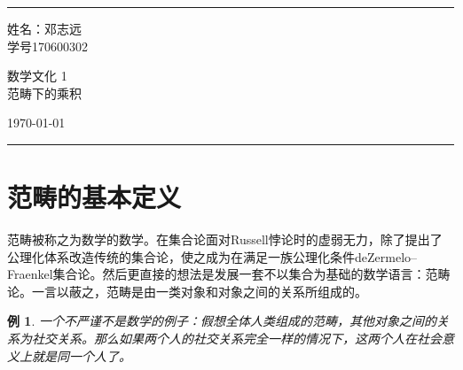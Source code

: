 \documentclass[a4paper]{article}
\newtheorem{example}{例}
\begin{document}

\fancyhead[C]{}
\hrule \medskip %
\begin{minipage}{0.295\textwidth} 
\raggedright
\footnotesize
姓名：邓志远 \\   
学号170600302 
\end{minipage}
\begin{minipage}{0.4\textwidth} 
\centering 
\large 
数学文化 1\\ 
\normalsize 
范畴下的乘积\\ 
\end{minipage}
\begin{minipage}{0.295\textwidth} 
\raggedleft
\today\hfill\\
\end{minipage}
\medskip\hrule 
\bigskip


\section{范畴的基本定义}
范畴被称之为数学的数学。在集合论面对Russell悖论时的虚弱无力，除了提出了公理化体系改造传统的集合论，使之成为在满足一族公理化条件deZermelo–Fraenkel集合论。然后更直接的想法是发展一套不以集合为基础的数学语言：范畴论。一言以蔽之，范畴是由一类对象和对象之间的关系所组成的。

\begin{example}
     一个不严谨不是数学的例子：假想全体人类组成的范畴，其他对象之间的关系为社交关系。那么如果两个人的社交关系完全一样的情况下，这两个人在社会意义上就是同一个人了。
\end{example}
\end{document}
